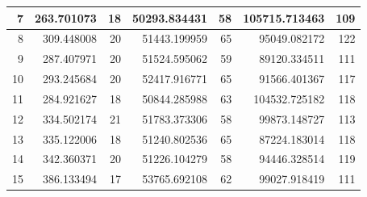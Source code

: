 \begin{table}
\begin{adjustwidth}{}{}
{{\begin{tabular}{|r|r|r|r|r|r|r|}
					\hline
					7                                          & 263.701073                   & 18                                    & 50293.834431                   & 58                                    & 105715.713463                & 109                                    \\ 
					\hline
					8                                          & 309.448008                   & 20                                    & 51443.199959                   & 65                                    & 95049.082172                 & 122                                    \\ 
					\hline
					9                                          & 287.407971                   & 20                                    & 51524.595062                   & 59                                    & 89120.334511                 & 111                                    \\ 
					\hline
					10                                         & 293.245684                   & 20                                    & 52417.916771                   & 65                                    & 91566.401367                 & 117                                    \\ 
					\hline
					11                                         & 284.921627                   & 18                                    & 50844.285988                   & 63                                    & 104532.725182                & 118                                    \\ 
					\hline
					12                                         & 334.502174                   & 21                                    & 51783.373306                   & 58                                    & 99873.148727                 & 113                                    \\ 
					\hline
					13                                         & 335.122006                   & 18                                    & 51240.802536                   & 65                                    & 87224.183014                 & 118                                    \\ 
					\hline
					14                                         & 342.360371                   & 20                                    & 51226.104279                   & 58                                    & 94446.328514                 & 119                                    \\ 
					\hline
					15                                         & 386.133494                   & 17                                    & 53765.692108                   & 62                                    & 99027.918419                 & 111                                    \\ 

\end{tabular}}}
\end{adjustwidth}
\end{table}
